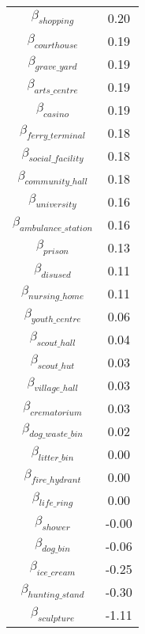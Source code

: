 \begin{tabular}{c|c}
$\beta_{shopping}$ & 0.20 \\
$\beta_{courthouse}$ & 0.19 \\
$\beta_{grave\_yard}$ & 0.19 \\
$\beta_{arts\_centre}$ & 0.19 \\
$\beta_{casino}$ & 0.19 \\
$\beta_{ferry\_terminal}$ & 0.18 \\
$\beta_{social\_facility}$ & 0.18 \\
$\beta_{community\_hall}$ & 0.18 \\
$\beta_{university}$ & 0.16 \\
$\beta_{ambulance\_station}$ & 0.16 \\
$\beta_{prison}$ & 0.13 \\
$\beta_{disused}$ & 0.11 \\
$\beta_{nursing\_home}$ & 0.11 \\
$\beta_{youth\_centre}$ & 0.06 \\
$\beta_{scout\_hall}$ & 0.04 \\
$\beta_{scout\_hut}$ & 0.03 \\
$\beta_{village\_hall}$ & 0.03 \\
$\beta_{crematorium}$ & 0.03 \\
$\beta_{dog\_waste\_bin}$ & 0.02 \\
$\beta_{litter\_bin}$ & 0.00 \\
$\beta_{fire\_hydrant}$ & 0.00 \\
$\beta_{life\_ring}$ & 0.00 \\
$\beta_{shower}$ & -0.00 \\
$\beta_{dog\_bin}$ & -0.06 \\
$\beta_{ice\_cream}$ & -0.25 \\
$\beta_{hunting\_stand}$ & -0.30 \\
$\beta_{sculpture}$ & -1.11 \\
\end{tabular}
